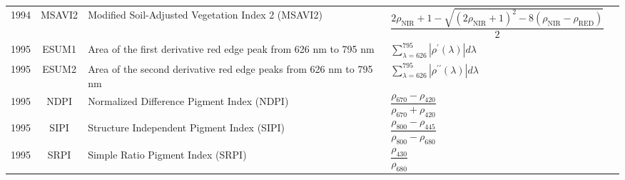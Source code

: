 \documentclass[10pt]{article}
\begin{document}
\begin{ThreePartTable}
\begin{longtable}{c c m{2.80in} M{2.80in} M{1.5in}}
  1994 & MSAVI2  & Modified Soil-Adjusted Vegetation Index 2 (MSAVI2)                             & $\dfrac{2\rho_\text{NIR}+1-\sqrt{(2\rho_\text{NIR}+1)^2-8(\rho_\text{NIR}-\rho_\text{RED})}}{2}$                                                                                                                                                                                        & \citet{Qi1994}                                      \\
  1995 & ESUM1   & Area of the first derivative red edge peak from 626 nm to 795 nm               & $\sum\limits_{\lambda=626}^{795}|{\rho^\prime(\lambda)}|d\lambda$                                                                                                                                                                                                                       & \citet{Elvidge1995}                                 \\
  1995 & ESUM2   & Area of the second derivative red edge peaks from 626 nm to 795 nm             & $\sum\limits_{\lambda=626}^{795}|{\rho^{\prime\prime}(\lambda)}|d\lambda$                                                                                                                                                                                                               & \citet{Elvidge1995}                                 \\
  1995 & NDPI    & Normalized Difference Pigment Index (NDPI)                                     & $\dfrac{\rho_{670}-\rho_{420}}{\rho_{670}+\rho_{420}}$                                                                                                                                                                                                                                  & \citet{Penuelas1995a}                               \\
  1995 & SIPI    & Structure Independent Pigment Index (SIPI)                                     & $\dfrac{\rho_{800}-\rho_{445}}{\rho_{800}-\rho_{680}}$                                                                                                                                                                                                                                  & \citet{Penuelas1995a}                               \\
  1995 & SRPI    & Simple Ratio Pigment Index (SRPI)                                              & $\dfrac{\rho_{430}}{\rho_{680}}$                                                                                                                                                                                                                                                        & \citet{Penuelas1995b}                               \\

\end{longtable}
\end{ThreePartTable}
\end{document}
